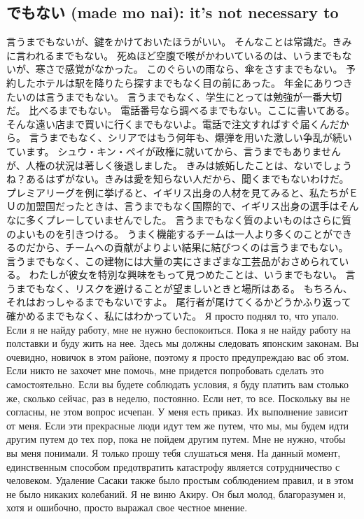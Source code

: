 \subsection{でもない (made mo nai): it’s not necessary to}
言うまでもないが、鍵をかけておいたほうがいい。
そんなことは常識だ。きみに言われるまでもない。
死ぬほど空腹で喉がかわいているのは、いうまでもないが、寒さで感覚がなかった。
このぐらいの雨なら、傘をさすまでもない。
予約したホテルは駅を降りたら探すまでもなく目の前にあった。
年金にありつきたいのは言うまでもない。
言うまでもなく、学生にとっては勉強が一番大切だ。
比べるまでもない。
電話番号なら調べるまでもない。ここに書いてある。
そんな遠い店まで買いに行くまでもないよ。電話で注文すればすぐ届くんだから。
言うまでもなく、シリアではもう何年も、爆弾を用いた激しい争乱が続いています。
シュウ・キン・ペイが政権に就いてから、言うまでもありませんが、人権の状況は著しく後退しました。
きみは嫉妬したことは、ないでしょうね？あるはずがない。きみは愛を知らない人だから、聞くまでもないわけだ。
プレミアリーグを例に挙げると、イギリス出身の人材を見てみると、私たちがＥＵの加盟国だったときは、言うまでもなく国際的で、イギリス出身の選手はそんなに多くプレーしていませんでした。
言うまでもなく質のよいものはさらに質のよいものを引きつける。
うまく機能するチームは一人より多くのことができるのだから、チームへの貢献がよりよい結果に結びつくのは言うまでもない。
言うまでもなく、この建物には大量の実にさまざまな工芸品がおさめられている。
わたしが彼女を特別な興味をもって見つめたことは、いうまでもない。
言うまでもなく、リスクを避けることが望ましいときと場所はある。
もちろん、それはおっしゃるまでもないですよ。
尾行者が尾けてくるかどうかふり返って確かめるまでもなく、私にはわかっていた。
Я просто поднял то, что упало.
Если я не найду работу, мне не нужно беспокоиться. Пока я не найду работу на полставки и буду жить на нее.
Здесь мы должны следовать японским законам.
Вы очевидно, новичок в этом районе, поэтому я просто предупреждаю вас об этом.
Если никто не захочет мне помочь, мне придется попробовать сделать это самостоятельно.
Если вы будете соблюдать условия, я буду платить вам столько же, сколько сейчас, раз в неделю, постоянно. Если нет, то все.
Поскольку вы не согласны, не этом вопрос исчепан.
У меня есть приказ. Их выполнение зависит от меня.
Если эти прекрасные люди идут тем же путем, что мы, мы будем идти другим путем до тех пор, пока не пойдем другим путем.
Мне не нужно, чтобы вы меня понимали. Я только прошу тебя слушаться меня. На данный момент, единственным способом предотвратить катастрофу является сотрудничество с человеком.
Удаление Сасаки также было простым соблюдением правил, и в этом не было никаких колебаний.
Я не виню Акиру. Он был молод, благоразумен и, хотя и ошибочно, просто выражал свое честное мнение.

